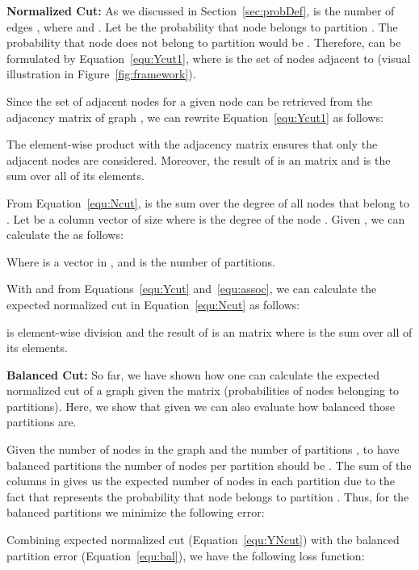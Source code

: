 \documentclass[10pt,twocolumn]{article}
\begin{document}
\noindent\textbf{Normalized Cut:} 
As we discussed in Section~\ref{sec:probDef},  is the number of edges , where  and . Let  be the probability that node  belongs to partition . The probability that node  does not belong to partition  would be . Therefore,  can be formulated by Equation~\ref{equ:Ycut1}, where  is the set of nodes adjacent to  (visual illustration in Figure~\ref{fig:framework}).



Since the set of adjacent nodes for a given node can be retrieved from the adjacency matrix of graph , we can rewrite Equation~\ref{equ:Ycut1} as follows:



The element-wise product with the adjacency matrix  ensures that only the adjacent nodes are considered. Moreover, the result of  is an  matrix and  is the sum over all of its elements.


From Equation~\ref{equ:Ncut},  is the sum over the degree of all nodes that belong to . Let  be a column vector of size  where  is the degree of the node . Given , we can calculate the  as follows:



Where  is a vector in , and  is the number of partitions. 

With  and  from Equations~\ref{equ:Ycut} and~\ref{equ:assoc}, we can calculate the expected normalized cut in Equation~\ref{equ:Ncut} as follows:



 is element-wise division and the result of  is an  matrix where  is the sum over all of its elements. 

\noindent\textbf{Balanced Cut:} So far, we have shown how one can calculate the expected normalized cut of a graph given the matrix  (probabilities of nodes belonging to partitions). Here, we show that given  we can also
evaluate how balanced those partitions are.

Given the number of nodes in the graph  and the number of partitions , to have balanced partitions the number of nodes per partition should be . The sum of the columns in  gives us the expected number of nodes in each partition due to the fact that  represents the probability that node  belongs to partition . Thus, for the balanced partitions we minimize the following error:



Combining expected normalized cut (Equation~\ref{equ:YNcut}) with the balanced partition error (Equation~\ref{equ:bal}), we have the following loss function:
\end{document}
